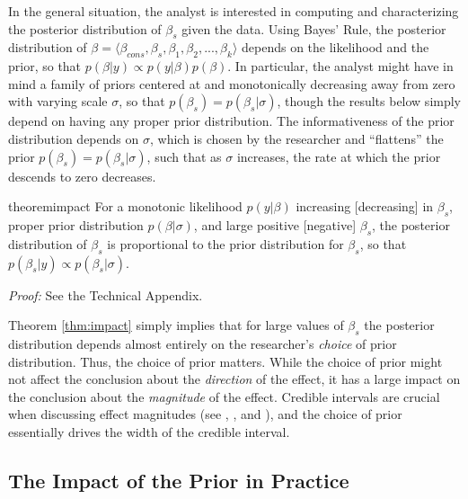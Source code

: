 \documentclass[12pt]{article}
\begin{document}
In the general situation, the analyst is interested in computing and characterizing the posterior distribution of $\beta_s$ given the data. Using Bayes' Rule, the posterior distribution of $\beta = \langle \beta_{cons}, \beta_{s}, \beta_1, \beta_2, ..., \beta_k \rangle$ depends on the likelihood and the prior, so that $p(\beta | y) \propto p(y|\beta)p(\beta)$. In particular, the analyst might have in mind a family of priors centered at and monotonically decreasing away from zero with varying scale $\sigma$, so that $p(\beta_s) = p(\beta_s | \sigma)$, though the results below simply depend on having any proper prior distribution. The informativeness of the prior distribution depends on $\sigma$, which is chosen by the researcher and ``flattens'' the prior $p(\beta_s) = p(\beta_s | \sigma)$, such that as $\sigma$ increases, the rate at which the prior descends to zero decreases.

\begin{restatable}{theorem}{impact}\label{thm:impact}
For a monotonic likelihood $p(y | \beta)$ increasing [decreasing] in $\beta_s$, proper prior distribution $p(\beta | \sigma)$, and large positive [negative] $\beta_s$, the posterior distribution of $\beta_s$ is proportional to the prior distribution for $\beta_s$, so that $p(\beta_s | y) \propto p(\beta_s | \sigma)$.
\end{restatable}

\noindent \textit{Proof:} See the Technical Appendix.

Theorem \ref{thm:impact} simply implies that for large values of $\beta_s$ the posterior distribution depends almost entirely on the researcher's \emph{choice} of prior distribution. Thus, the choice of prior matters. While the choice of prior might not affect the conclusion about the \emph{direction} of the effect, it has a large impact on the conclusion about the \emph{magnitude} of the effect. Credible intervals are crucial when discussing effect magnitudes (see \citealt{Rainey2014}, \citealt{Gross2014}, and \citealt{McCaskeyRainey2014}), and the choice of prior essentially drives the width of the credible interval.

\subsection*{The Impact of the Prior in Practice}
\end{document}
